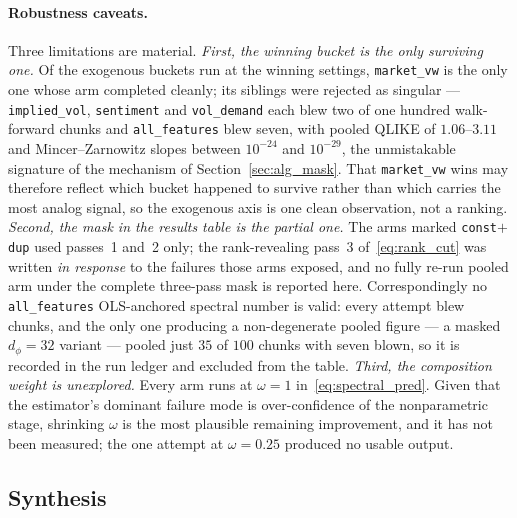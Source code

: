 \paragraph{Robustness caveats.}
Three limitations are material. \emph{First, the winning bucket is the only
surviving one.} Of the exogenous buckets run at the winning settings,
\texttt{market\_vw} is the only one whose arm completed cleanly; its siblings were
rejected as singular --- \texttt{implied\_vol}, \texttt{sentiment} and
\texttt{vol\_demand} each blew two of one hundred walk-forward chunks and
\texttt{all\_features} blew seven, with pooled QLIKE of $1.06$--$3.11$ and
Mincer--Zarnowitz slopes between $10^{-24}$ and $10^{-29}$, the unmistakable
signature of the mechanism of Section~\ref{sec:alg_mask}. That \texttt{market\_vw}
wins may therefore reflect which bucket happened to survive rather than which
carries the most analog signal, so the exogenous axis is one clean observation, not
a ranking. \emph{Second, the mask in the results table is the partial one.} The
arms marked \texttt{const}$+$\texttt{dup} used passes~1 and~2 only; the
rank-revealing pass~3 of~\eqref{eq:rank_cut} was written \emph{in response} to the
failures those arms exposed, and no fully re-run pooled arm under the complete
three-pass mask is reported here. Correspondingly no \texttt{all\_features}
OLS-anchored spectral number is valid: every attempt blew chunks, and the only one
producing a non-degenerate pooled figure --- a masked $d_\phi = 32$ variant ---
pooled just $35$ of $100$ chunks with seven blown, so it is recorded in the run
ledger and excluded from the table. \emph{Third, the composition weight is
unexplored.} Every arm runs at $\omega = 1$ in~\eqref{eq:spectral_pred}. Given that
the estimator's dominant failure mode is over-confidence of the nonparametric
stage, shrinking $\omega$ is the most plausible remaining improvement, and it has
not been measured; the one attempt at $\omega = 0.25$ produced no usable output.

\subsection{Synthesis}
\label{sec:alg_synthesis}

